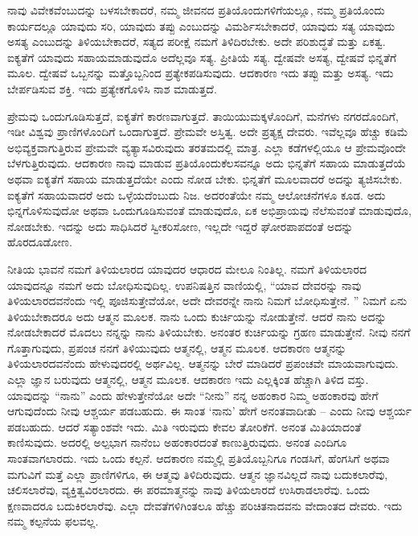 ನಾವು ವಿವೇಕವೆಂಬುದನ್ನು ಬಳಸಬೇಕಾದರೆ, ನಮ್ಮ ಜೀವನದ ಪ್ರತಿಯೊಂದುಗಳಿಗೆ\break ಯಲ್ಲೂ, ನಮ್ಮ ಪ್ರತಿಯೊಂದು ಕಾರ್ಯದಲ್ಲೂ ಯಾವುದು ಸರಿ, ಯಾವುದು ತಪ್ಪು ಎಂಬುದನ್ನು ವಿಮರ್ಶಿಸಬೇಕಾದರೆ, ಯಾವುದು ಸತ್ಯ ಯಾವುದು ಅಸತ್ಯ ಎಂಬುದನ್ನು ತಿಳಿಯಬೇಕಾದರೆ, ಸತ್ಯದ ಪರೀಕ್ಷೆ ನಮಗೆ ತಿಳಿದಿರಬೇಕು. ಅದೇ ಪರಿಶುದ್ಧತೆ ಮತ್ತು ಏಕತ್ವ. ಐಕ್ಯತೆಗೆ ಯಾವುದು ಸಹಾಯಮಾಡುವುದೊ ಅದೆಲ್ಲವೂ ಸತ್ಯ. ಪ್ರೀತಿಯೆ ಸತ್ಯ. ದ್ವೇಷವೇ ಅಸತ್ಯ, ದ್ವೇಷವೆ ಭಿನ್ನತೆಗೆ ಮೂಲ. ದ್ವೇಷವೆ ಒಬ್ಬನನ್ನು ಮತ್ತೊಬ್ಬನಿಂದ ಪ್ರತ್ಯೇಕಪಡಿಸುವುದು. ಆದಕಾರಣ ಇದು ತಪ್ಪು ಮತ್ತು ಅಸತ್ಯ. ಇದು ಬೇರ್ಪಡಿಸುವ ಶಕ್ತಿ. ಇದು ಪ್ರತ್ಯೇಕಗೊಳಿಸಿ ನಾಶ ಮಾಡುತ್ತದೆ. 

ಪ್ರೇಮವು ಒಂದುಗೂಡಿಸುತ್ತದೆ, ಐಕ್ಯತೆಗೆ ಕಾರಣವಾಗುತ್ತದೆ. ತಾಯಿಯು\break ಮಕ್ಕಳೊಂದಿಗೆ, ಮನೆಗಳು ನಗರದೊಂದಿಗೆ, ಇಡೀ ವಿಶ್ವವು ಪ್ರಾಣಿಗಳೊಂದಿಗೆ ಒಂದಾಗುತ್ತದೆ. ಪ್ರೇಮವೇ ಅಸ್ತಿತ್ವ. ಅದೇ ಪ್ರತ್ಯಕ್ಷ ದೇವರು. ಇವೆಲ್ಲವೂ ಹೆಚ್ಚು ಕಡಿಮೆ ಅಭಿವ್ಯಕ್ತವಾಗುತ್ತಿರುವ ಪ್ರೇಮವೇ ವ್ಯತ್ಯಾಸವಿರುವುದು ತರತಮದಲ್ಲಿ ಮಾತ್ರ. ಎಲ್ಲಾ ಕಡೆಗಳಲ್ಲಿಯೂ ಆ ಪ್ರೇಮವೊಂದೇ ಬೆಳಗುತ್ತಿರುವುದು. ಆದಕಾರಣ ನಾವು ಮಾಡುವ ಪ್ರತಿಯೊಂದು\break ಕೆಲಸವನ್ನೂ ಅದು ಭಿನ್ನತೆಗೆ ಸಹಾಯ ಮಾಡುತ್ತದೆಯೆ ಅಥವಾ ಐಕ್ಯತೆಗೆ ಸಹಾಯ ಮಾಡುತ್ತದೆಯೇ ಎಂದು ನೋಡ ಬೇಕು. ಭಿನ್ನತೆಗೆ ಮೂಲವಾದರೆ ಅದನ್ನು ತ್ಯಜಿಸಬೇಕು. ಐಕ್ಯತೆಗೆ ಸಹಾಯವಾದರೆ ಅದು ಒಳ್ಳೆಯದೆಂಬುದು ನಿಜ. ಅದರಂತೆಯೇ ನಮ್ಮ ಆಲೋಚನೆಗಳೂ ಕೂಡ. ಅದು ಭಿನ್ನಗೊಳಿಸುವುದೋ ಅಥವಾ ಒಂದುಗೂಡಿಸುವಂತೆ ಮಾಡುವುದೊ, ಏಕ ಅಭಿಪ್ರಾಯವು ನೆಲೆಸುವಂತೆ ಮಾಡುವುದೊ, ನೋಡಬೇಕು. ಇದನ್ನು ಅದು ಸಾಧಿಸಿದರೆ ಸ್ವೀಕರಿಸೋಣ, ಇಲ್ಲದೇ ಇದ್ದರೆ ಘೋರಪಾಪದಂತೆ ಅದನ್ನು ಹೊರದೂಡೋಣ. 

ನೀತಿಯ ಭಾವನೆ ನಮಗೆ ತಿಳಿಯಲಾರದ ಯಾವುದರ ಆಧಾರದ ಮೇಲೂ ನಿಂತಿಲ್ಲ. ನಮಗೆ ತಿಳಿಯಲಾರದ ಯಾವುದನ್ನೂ ನಮಗೆ ಅದು ಬೋಧಿಸುವುದಿಲ್ಲ. ಉಪನಿಷತ್ತಿನ ವಾಣಿಯಲ್ಲಿ, “ಯಾವ ದೇವರನ್ನು ನಾವು ತಿಳಿಯಲಾರದವನೆಂದು ಇಲ್ಲಿ ಪೂಜಿಸುತ್ತೇ\break ವೆಯೋ, ಅದೇ ದೇವರನ್ನೇ ನಾನು ನಿಮಗೆ ಬೋಧಿಸುತ್ತೇನೆ. ” ನಿಮಗೆ ಏನು ತಿಳಿಯಬೇಕಾದರೂ ಅದು ಆತ್ಮನ ಮೂಲಕ. ನಾನು ಒಂದು ಕುರ್ಚಿಯನ್ನು ನೋಡುತ್ತೇನೆ. ಆದರೆ ನಾನು ಅದನ್ನು ನೋಡಬೇಕಾದರೆ ಮೊದಲು ನನ್ನನ್ನು ನಾನು ತಿಳಿಯಬೇಕು. ಅನಂತರ ಕುರ್ಚಿಯನ್ನು ಗ್ರಹಣ ಮಾಡುತ್ತೇನೆ. ನೀವು ನನಗೆ ಗೊತ್ತಾಗುವುದು, ಪ್ರಪಂಚ ನನಗೆ ತಿಳಿಯುವುದು ಆತ್ಮನಲ್ಲಿ, ಆತ್ಮನ ಮೂಲಕ. ಆದಕಾರಣ ಆತ್ಮನನ್ನು ತಿಳಿಯಲಾರದವನೆಂದು ಹೇಳುವುದರಲ್ಲಿ ಅರ್ಥವಿಲ್ಲ. ಆತ್ಮನನ್ನು ಬೇರೆ ಮಾಡಿದರೆ ಪ್ರಪಂಚವೇ ಮಾಯವಾಗುವುದು. ಎಲ್ಲಾ ಜ್ಞಾನ ಬರುವುದು ಆತ್ಮನಲ್ಲಿ, ಆತ್ಮನ ಮೂಲಕ. ಆದಕಾರಣ ಇದು ಎಲ್ಲಕ್ಕಿಂತ ಹೆಚ್ಚಾಗಿ ತಿಳಿದ ವಸ್ತು. ಯಾವುದನ್ನು “ನಾನು” ಎಂದು ಹೇಳುತ್ತೇನೆಯೋ ಅದೇ “ನೀನು” ನನ್ನ ಅಹಂಕಾರ ನಿಮ್ಮ ಅಹಂಕಾರವು ಹೇಗೆ ಆಗುವುದೆಂದು ನೀವು ಆಶ್ಚರ್ಯ ಪಡಬಹುದು. ಈ ಸಾಂತ ‘ನಾನು’ ಹೇಗೆ ಅನಂತವಾದೀತು – ಎಂದು ನೀವು ಆಶ್ಚರ್ಯ ಪಡಬಹುದು. ಆದರೆ ಸತ್ಯಾಂಶವೇ ಇದು. ಮಿತಿ ಇರುವುದು ಕೇವಲ ತೋರಿಕೆಗೆ. ಅನಂತ ಮಿತಿಯಾದಂತೆ ಕಾಣಿಸುವುದು. ಅದರಲ್ಲಿ ಅಲ್ಪಭಾಗ ನಾನೆಂಬ ಅಹಂಕಾರದಂತೆ ಕಾಣುತ್ತಿರುವುದು. ಅನಂತ ಎಂದಿಗೂ ಸಾಂತವಾಗಲಾರದು. ಇದು ಒಂದು ಕಲ್ಪನೆ. ಆದಕಾರಣ ನಮ್ಮಲ್ಲಿ ಪ್ರತಿಯೊಬ್ಬನಿಗೂ ಗಂಡಸಿಗೆ, ಹೆಂಗಸಿಗೆ ಅಥವಾ ಮಗುವಿಗೆ ಮತ್ತೆ ಎಲ್ಲಾ ಪ್ರಾಣಿಗಳಿಗೂ, ಈ ಆತ್ಮವು ತಿಳಿದಿರುವುದು. ಆತ್ಮನ ಜ್ಞಾನವಿಲ್ಲದೆ ನಾವು ಬದುಕಲಾರೆವು, ಚಲಿಸಲಾರೆವು, ವ್ಯಕ್ತಿತ್ವವಿರಲಾರದು. ಈ ಪರಮಾತ್ಮನನ್ನು ನಾವು ತಿಳಿಯಲಾರದೆ ಉಸಿರಾಡಲಾರೆವು. ಒಂದು ಕ್ಷಣವಾದರೂ ಬದುಕಿರಲಾರೆವು. ಎಲ್ಲಾ ದೇವತೆಗಳಿಗಿಂತಲೂ ಹೆಚ್ಚು ಪರಿಚಿತನಾದವನು ವೇದಾಂತದ ದೇವರು. ಇದು ನಮ್ಮ ಕಲ್ಪನೆಯ ಫಲವಲ್ಲ. 

